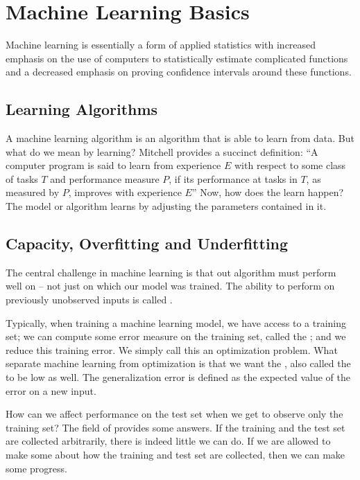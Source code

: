 
\chapter{Machine Learning Basics}
Machine learning is essentially a form of applied statistics with increased emphasis on the use of computers to statistically estimate complicated functions and a decreased emphasis on proving confidence intervals around these functions.


\section{Learning Algorithms}

A machine learning algorithm is an algorithm that is able to learn from data.
But what do we mean by learning?
Mitchell provides a succinct definition:
``A computer program is said to learn from experience $E$ with respect to some class of tasks $T$ and performance measure $P$, if its performance at tasks in $T$, as measured by $P$, improves with experience $E$''
Now, how does the learn happen?
The model or algorithm learns by adjusting the parameters contained in it.


\section{Capacity, Overfitting and Underfitting}

The central challenge in machine learning is that out algorithm must perform well on  -- not just on which our model was trained.
The ability to perform on previously unobserved inputs is called .

Typically, when training a machine learning model, we have access to a training set;
we can compute some error measure on the training set, called the ;
and we reduce this training error.
We simply call this an optimization problem.
What separate machine learning from optimization is that we want the , also called the  to be low as well.
The generalization error is defined as the expected value of the error on a new input.



How can we affect performance on the test set when we get to observe only the training set? 
The field of  provides some answers. 
If the training and the test set are collected arbitrarily, there is indeed little we can do.
If we are allowed to make some  about how the training and test set are collected, then we can make some progress.

